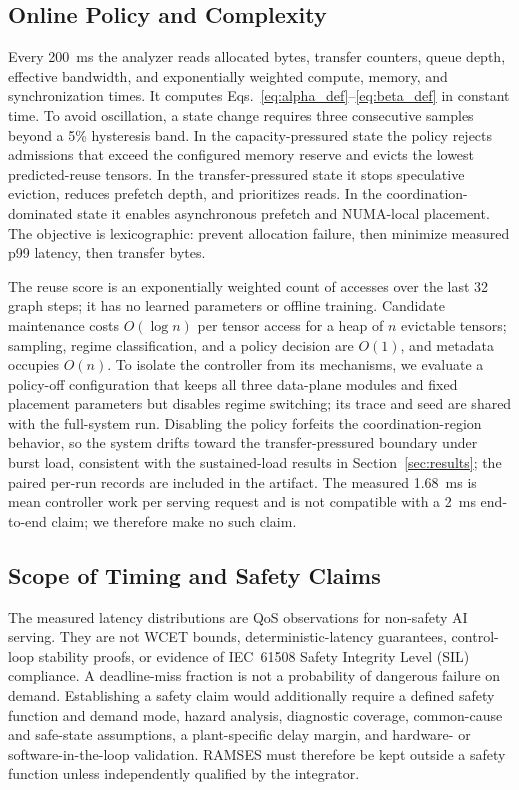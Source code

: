 \subsection{Online Policy and Complexity}\label{sec:controller}
Every 200~ms the analyzer reads allocated bytes, transfer counters, queue
depth, effective bandwidth, and exponentially weighted compute, memory, and
synchronization times.  It computes Eqs.~\eqref{eq:alpha_def}--\eqref{eq:beta_def}
in constant time.  To avoid oscillation, a state change requires three
consecutive samples beyond a 5\% hysteresis band.  In the capacity-pressured
state the policy rejects admissions that exceed the configured memory reserve
and evicts the lowest predicted-reuse tensors.  In the transfer-pressured state
it stops speculative eviction, reduces prefetch depth, and prioritizes reads.
In the coordination-dominated state it enables asynchronous prefetch and
NUMA-local placement.  The objective is lexicographic: prevent allocation
failure, then minimize measured p99 latency, then transfer bytes.

The reuse score is an exponentially weighted count of accesses over the last
32 graph steps; it has no learned parameters or offline training.  Candidate
maintenance costs $O(\log n)$ per tensor access for a heap of $n$ evictable
tensors; sampling, regime classification, and a policy decision are $O(1)$,
and metadata occupies $O(n)$.  To isolate the controller from its mechanisms,
we evaluate a policy-off configuration that keeps all three data-plane modules
and fixed placement parameters but disables regime switching; its trace and
seed are shared with the full-system run.  Disabling the policy forfeits the
coordination-region behavior, so the system drifts toward the transfer-pressured
boundary under burst load, consistent with the sustained-load results in
Section~\ref{sec:results}; the paired per-run records are included in the
artifact.  The measured 1.68~ms is mean controller work per serving request
and is not compatible with a 2~ms end-to-end claim; we therefore make no such
claim.

\subsection{Scope of Timing and Safety Claims}
The measured latency distributions are QoS observations for non-safety AI
serving.  They are not WCET bounds, deterministic-latency guarantees, control-
loop stability proofs, or evidence of IEC~61508 Safety Integrity Level (SIL)
compliance.  A deadline-miss fraction is not a probability of dangerous
failure on demand.  Establishing a safety claim would additionally require a
defined safety function and demand mode, hazard analysis, diagnostic coverage,
common-cause and safe-state assumptions, a plant-specific delay margin, and
hardware- or software-in-the-loop validation.  RAMSES must therefore be kept
outside a safety function unless independently qualified by the integrator.

